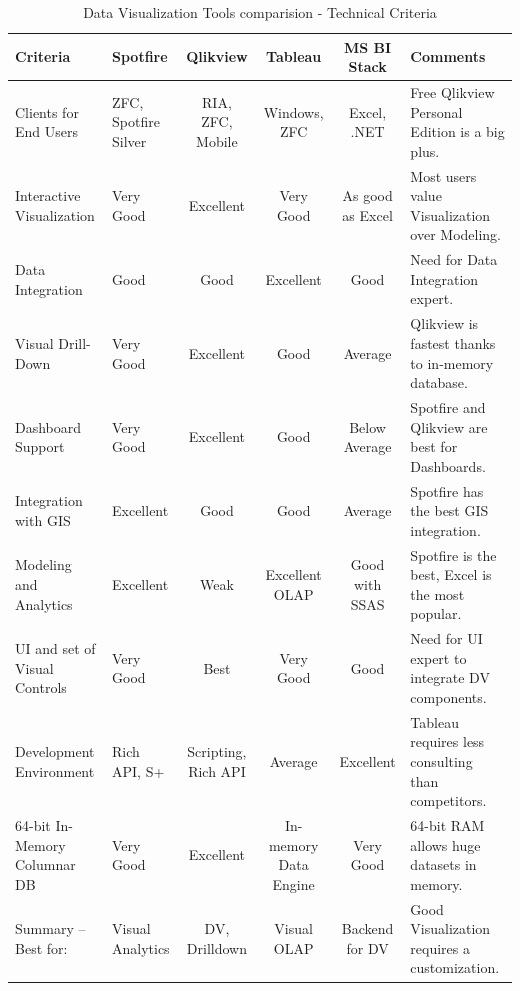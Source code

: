  \begin{table}[p] 

\caption{Data Visualization Tools comparision - Technical Criteria \cite{compare}} %
\centering      %

\begin{tabular}{p{2cm} p{2cm} c c c p{3cm}}  %
\hline\hline 
    \textbf{Criteria} & \textbf{Spotfire} &  \textbf{Qlikview} & \textbf{Tableau} & \textbf{MS BI Stack} & \textbf{Comments} \\ \hline
    Clients for End Users & ZFC, Spotfire Silver & RIA, ZFC, Mobile & Windows, ZFC & Excel, .NET & Free Qlikview Personal Edition is a big plus.\\
    Interactive Visualization & Very Good & Excellent & Very Good & As good as Excel & Most users value Visualization over Modeling.\\
    Data Integration & Good & Good & Excellent & Good & Need for Data Integration expert.\\
    Visual Drill-Down  & Very Good & Excellent & Good & Average & Qlikview is fastest thanks to in-memory database.\\
    Dashboard Support & Very Good & Excellent & Good & Below Average & Spotfire and Qlikview are best for Dashboards.\\
    Integration with GIS & Excellent & Good & Good & Average & Spotfire has the best GIS integration.\\
    Modeling and Analytics & Excellent & Weak & Excellent OLAP & Good with SSAS & Spotfire is the best, Excel is the most popular.\\
    
    UI and set of Visual Controls  & Very Good & Best & Very Good & Good & Need for UI expert to integrate DV components.\\
    Development Environment & Rich API, S+ & Scripting, Rich API & Average & Excellent & Tableau requires less consulting than competitors.\\
    64-bit In-Memory Columnar DB & Very Good & Excellent & In-memory Data Engine & Very Good & 64-bit RAM allows huge datasets in memory.\\
    Summary $–$ Best for:	 & Visual Analytics	 & DV, Drilldown & Visual OLAP & Backend for DV & Good Visualization requires a customization.\\
    
    
    
     \hline     %
    \end{tabular} 
    \label{table:comparision}  %

    \end{table} 

